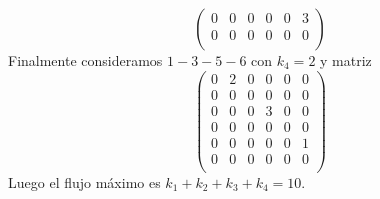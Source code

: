 \documentclass[twoside]{article}
\begin{document}
\begin{solucion}
$$\begin{pmatrix}
0	&0	&0	&0	&0	&3\\
0	&0	&0	&0	&0	&0\\
\end{pmatrix}
$$
Finalmente consideramos $1-3-5-6$ con $k_4=2$ y matriz
$$
\begin{pmatrix}
0	&2	&0	&0	&0	&0\\
0	&0	&0	&0	&0	&0\\
0	&0	&0	&3	&0	&0\\
0	&0	&0	&0	&0	&0\\
0	&0	&0	&0	&0	&1\\
0	&0	&0	&0	&0	&0\\
\end{pmatrix}
$$
Luego el flujo máximo es $k_1+k_2+k_3+k_4 = 10$.
\end{solucion}
\newpage
\end{document}
